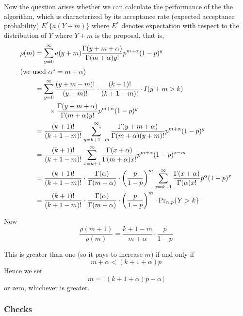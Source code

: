 \documentclass[11pt]{article}
\newcommand{\Prsub}[1]{\Pr\nolimits_{#1}}
\begin{document}
Now the question arises whether we can calculate the performance of the
the algorithm, which is characterized by its acceptance rate
(expected acceptance probability) $E^* \{ a(Y + m) \}$
where $E^*$ denotes expectation with respect to the distribution of
$Y$ where $Y + m$ is the proposal, that is,
\begin{align*}
   \rho(m)
   & =
   \sum_{y = 0}^\infty
   a(y + m) 
   \frac{\Gamma(y + m + \alpha)}{\Gamma(m + \alpha) y !}
   p^{m + \alpha} (1 - p)^y
   \\
\intertext{(we used $\alpha^* = m + \alpha$)}
   & =
   \sum_{y = 0}^\infty
   \frac{(y + m - m) !}{(y + m) !}
   \cdot
   \frac{(k + 1) !}{(k + 1 - m) !}
   \cdot
   I(y + m > k)
   \\
   & \qquad
   \times
   \frac{\Gamma(y + m + \alpha)}{\Gamma(m + \alpha) y !}
   p^{m + \alpha} (1 - p)^y
   \\
   & =
   \frac{(k + 1) !}{(k + 1 - m) !}
   \sum_{y = k + 1 - m}^\infty
   \frac{\Gamma(y + m + \alpha)}{\Gamma(m + \alpha) (y + m) !}
   p^{m + \alpha} (1 - p)^y
   \\
   & =
   \frac{(k + 1) !}{(k + 1 - m) !}
   \sum_{x = k + 1}^\infty
   \frac{\Gamma(x + \alpha)}{\Gamma(m + \alpha) x !}
   p^{m + \alpha} (1 - p)^{x - m}
   \\
   & =
   \frac{(k + 1) !}{(k + 1 - m) !}
   \cdot
   \frac{\Gamma(\alpha)}{\Gamma(m + \alpha)}
   \cdot
   \left(\frac{p}{1 - p}\right)^m
   \sum_{x = k + 1}^\infty
   \frac{\Gamma(x + \alpha)}{\Gamma(\alpha) x !}
   p^\alpha (1 - p)^x
   \\
   & =
   \frac{(k + 1) !}{(k + 1 - m) !}
   \cdot
   \frac{\Gamma(\alpha)}{\Gamma(m + \alpha)}
   \cdot
   \left(\frac{p}{1 - p}\right)^m
   \cdot
   \Prsub{\alpha, p}\{ Y > k \}
   \\
\end{align*}

Now
$$
   \frac{\rho(m + 1)}{\rho(m)}
   =
   \frac{k + 1 - m} {m + \alpha}
   \cdot
   \frac{p}{1 - p}
$$

This is greater than one (so it pays to increase $m$) if and only if
$$
   m + \alpha < (k + 1 + \alpha) p
$$
Hence we set
$$
   m = \lceil (k + 1 + \alpha) p - \alpha \rceil
$$
or zero, whichever is greater.

\subsubsection{Checks}
\end{document}
